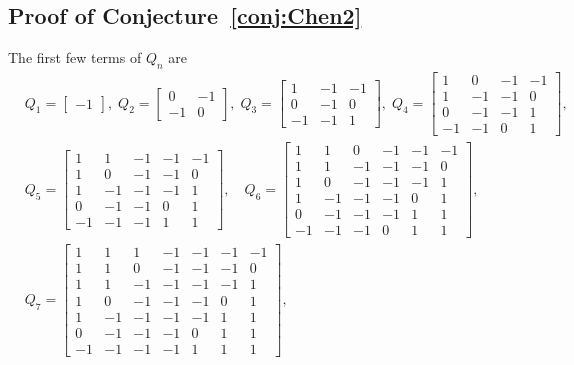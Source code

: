 \documentclass[11pt,reqno]{amsart}
\numberwithin{equation}{section}
\theoremstyle{plain}
\theoremstyle{definition}
\begin{document}
 \subsection{Proof of Conjecture~\ref{conj:Chen2}}
 The first few terms of $Q_n$ are
 \begin{align*}
 &Q_1=\begin{bmatrix}
 -1
\end{bmatrix},
\;
Q_2=\begin{bmatrix}
0 & -1 \\
-1 & 0
\end{bmatrix},
\;
Q_3=\begin{bmatrix}
1 & -1 & -1 \\
0& -1  & 0\\
-1& -1 &1
\end{bmatrix},
\;
Q_4=\begin{bmatrix}
1 & 0 & -1 & -1\\
1 & -1 & -1 & 0\\
0 & -1 & -1 & 1\\
-1 & -1 & 0 & 1
\end{bmatrix},
\;\\
& Q_5=\begin{bmatrix}
1 & 1 & -1 & -1&-1\\
1 & 0 &-1 & -1 & 0\\
1 & -1 & -1 &-1 & 1\\
0& -1 & -1 & 0 & 1\\
-1&-1&-1&1&1
\end{bmatrix},
\quad
Q_6=\begin{bmatrix}
1 & 1 & 0 & -1 & -1 & -1\\
1 & 1 & -1 & -1 & -1 & 0 \\
1 & 0 & -1 & -1 & -1 & 1\\
1 & -1 & -1 & -1 & 0 & 1\\
0 & -1& -1 & -1 & 1 & 1\\
 -1 & -1 & -1 & 0 & 1 & 1
\end{bmatrix},\\
&Q_7=\begin{bmatrix}
1 & 1 & 1 & -1 & -1 & -1& -1\\
1 & 1 & 0 & -1 & -1 & -1 & 0 \\
1 & 1 & -1 & -1 & -1 &-1 & 1\\
1 &0& -1 & -1 & -1 & 0 & 1\\
1 & -1 & -1 & -1 & -1 &1 & 1\\
0 & -1& -1 & -1 &0& 1 & 1\\
 -1 & -1 & -1 & -1 & 1 & 1 & 1
\end{bmatrix},

\end{align*}
\end{document}
